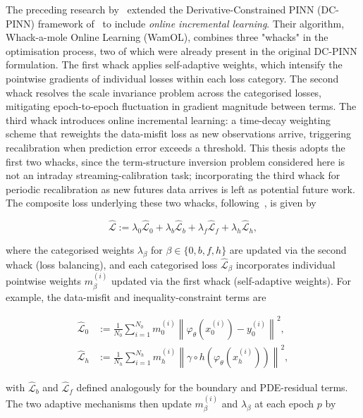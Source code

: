 \documentclass[11pt, a4paper]{article}
\begin{document}
The preceding research by~\cite{Hoshisashi2024Whack-a-moleSurface} extended the Derivative-Constrained PINN (DC-PINN) framework of~\cite{Hoshisashi2024Physics-InformedPDEs} to include \textit{online incremental learning}. Their algorithm, Whack-a-mole Online Learning (WamOL), combines three "whacks" in the optimisation process, two of which were already present in the original DC-PINN formulation. The first whack applies self-adaptive weights, which intensify the pointwise gradients of individual losses within each loss category. The second whack resolves the scale invariance problem across the categorised losses, mitigating epoch-to-epoch fluctuation in gradient magnitude between terms. The third whack introduces online incremental learning: a time-decay weighting scheme that reweights the data-misfit loss as new observations arrive, triggering recalibration when prediction error exceeds a threshold. This thesis adopts the first two whacks, since the term-structure inversion problem considered here is not an intraday streaming-calibration task; incorporating the third whack for periodic recalibration as new futures data arrives is left as potential future work. The composite loss underlying these two whacks, following~\cite{Hoshisashi2024Physics-InformedPDEs}, is given by

\begin{equation}
    \hat{\mathcal{L}} := \lambda_0 \hat{\mathcal{L}}_0 + \lambda_b \hat{\mathcal{L}}_b + \lambda_f \hat{\mathcal{L}}_f + \lambda_h \hat{\mathcal{L}}_h,
    \label{eq:dcpinn-composite}
\end{equation}

where the categorised weights $\lambda_\beta$ for $\beta \in \{0, b, f, h\}$ are updated via the second whack (loss balancing), and each categorised loss $\hat{\mathcal{L}}_\beta$ incorporates individual pointwise weights $m_\beta^{(i)}$ updated via the first whack (self-adaptive weights). For example, the data-misfit and inequality-constraint terms are

\begin{align}
    \hat{\mathcal{L}}_0 &:= \frac{1}{N_0} \sum_{i=1}^{N_0} m_0^{(i)} \left\| \varphi_\theta\!\left(x_0^{(i)}\right) - y_0^{(i)} \right\|^2, \label{eq:dcpinn-L0} \\
    \hat{\mathcal{L}}_h &:= \frac{1}{N_h} \sum_{i=1}^{N_h} m_h^{(i)} \left\| \gamma \circ h\!\left(\varphi_\theta\!\left(x_h^{(i)}\right)\right) \right\|^2, \label{eq:dcpinn-Lh}
\end{align}

with $\hat{\mathcal{L}}_b$ and $\hat{\mathcal{L}}_f$ defined analogously for the boundary and PDE-residual terms. The two adaptive mechanisms then update $m_\beta^{(i)}$ and $\lambda_\beta$ at each epoch $p$ by
\end{document}
